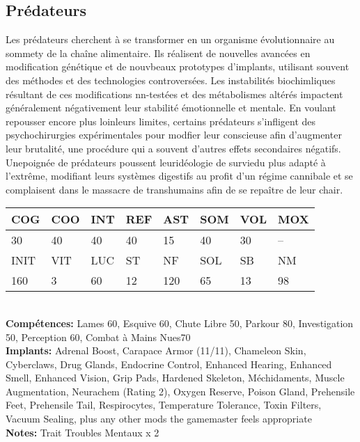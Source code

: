 \subsection{Prédateurs} 

Les prédateurs cherchent à se transformer en un organisme évolutionnaire au sommety de la chaîne alimentaire. Ils réalisent de nouvelles avancées en modification génétique et de nouvbeaux prototypes d'implants, utilisant souvent des méthodes et des technologies controversées. Les instabilités biochimliques résultant de ces modifications nn-testées et des métabolismes altérés impactent généralement négativement leur stabilité émotionnelle et mentale. En voulant repousser encore plus loinleurs limites, certains prédateurs s'infligent des psychochirurgies expérimentales pour modfier leur conscieuse afin d'augmenter leur brutalité, une procédure qui a souvent d'autres effets secondaires négatifs. Unepoignée de prédateurs poussent leuridéologie de surviedu plus adapté à l'extrême, modifiant leurs systèmes digestifs au profit d'un régime cannibale et se complaisent dans le massacre de transhumains afin de se repaître de leur chair. 

\begin{tabular}{|l|l|l|l|l|l|l|l|} \hline

COG &COO &INT &REF &AST &SOM &VOL &MOX \\ \hline

30 &40 &40 &40 &15 &40 &30 &-- \\ \hline

INIT &VIT &LUC &ST &NF &SOL &SB &NM \\ \hline

160 &3 &60 &12 &120 &65 &13 &98 \\ \hline

\end{tabular} \\ \textbf{Compétences:} Lames 60, Esquive 60, Chute Libre 50, Parkour 80, Investigation 50, Perception 60, Combat à Mains Nues70 \\ \textbf{Implants:} Adrenal Boost, Carapace Armor (11/11), Chameleon Skin, Cyberclaws, Drug Glands, Endocrine Control, Enhanced Hearing, Enhanced Smell, Enhanced Vision, Grip Pads, Hardened Skeleton, Méchidaments, Muscle Augmentation, Neurachem (Rating 2), Oxygen Reserve, Poison Gland, Prehensile Feet, Prehensile Tail, Respirocytes, Temperature Tolerance, Toxin Filters, Vacuum Sealing, plus any other mods the gamemaster feels appropriate \\ \textbf{Notes:} Trait Troubles Mentaux x 2 \\ 

